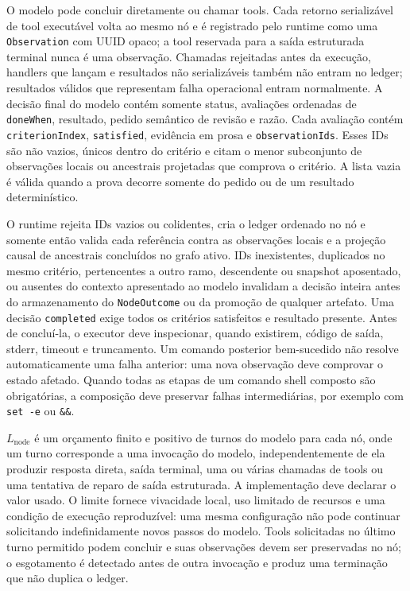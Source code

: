 \documentclass[12pt,a4paper]{article}
\begin{document}
O modelo pode concluir diretamente ou chamar tools. Cada retorno serializável de tool executável volta ao mesmo nó e é registrado pelo runtime como uma \texttt{Observation} com UUID opaco; a tool reservada para a saída estruturada terminal nunca é uma observação. Chamadas rejeitadas antes da execução, handlers que lançam e resultados não serializáveis também não entram no ledger; resultados válidos que representam falha operacional entram normalmente. A decisão final do modelo contém somente status, avaliações ordenadas de \texttt{doneWhen}, resultado, pedido semântico de revisão e razão. Cada avaliação contém \texttt{criterionIndex}, \texttt{satisfied}, evidência em prosa e \texttt{observationIds}. Esses IDs são não vazios, únicos dentro do critério e citam o menor subconjunto de observações locais ou ancestrais projetadas que comprova o critério. A lista vazia é válida quando a prova decorre somente do pedido ou de um resultado determinístico.

O runtime rejeita IDs vazios ou colidentes, cria o ledger ordenado no nó e somente então valida cada referência contra as observações locais e a projeção causal de ancestrais concluídos no grafo ativo. IDs inexistentes, duplicados no mesmo critério, pertencentes a outro ramo, descendente ou snapshot aposentado, ou ausentes do contexto apresentado ao modelo invalidam a decisão inteira antes do armazenamento do \texttt{NodeOutcome} ou da promoção de qualquer artefato. Uma decisão \texttt{completed} exige todos os critérios satisfeitos e resultado presente. Antes de concluí-la, o executor deve inspecionar, quando existirem, código de saída, stderr, timeout e truncamento. Um comando posterior bem-sucedido não resolve automaticamente uma falha anterior: uma nova observação deve comprovar o estado afetado. Quando todas as etapas de um comando shell composto são obrigatórias, a composição deve preservar falhas intermediárias, por exemplo com \texttt{set -e} ou \texttt{\&\&}.

\(L_{\mathrm{node}}\) é um orçamento finito e positivo de turnos do modelo para cada nó, onde um turno corresponde a uma invocação do modelo, independentemente de ela produzir resposta direta, saída terminal, uma ou várias chamadas de tools ou uma tentativa de reparo de saída estruturada. A implementação deve declarar o valor usado. O limite fornece vivacidade local, uso limitado de recursos e uma condição de execução reproduzível: uma mesma configuração não pode continuar solicitando indefinidamente novos passos do modelo. Tools solicitadas no último turno permitido podem concluir e suas observações devem ser preservadas no nó; o esgotamento é detectado antes de outra invocação e produz uma terminação que não duplica o ledger.
\end{document}
